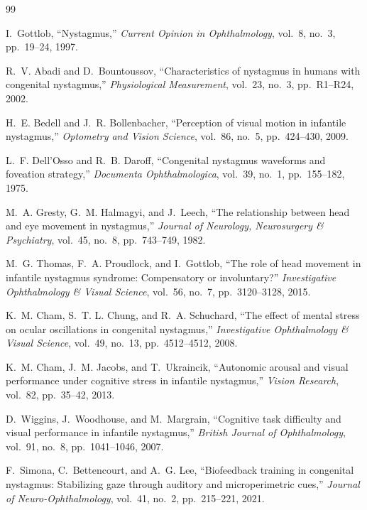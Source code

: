 \documentclass[12pt,a4paper,oneside]{report}
\begin{document}
\cleardoublepage
{}
\begin{thebibliography}{99}

I.~Gottlob, ``Nystagmus,'' \emph{Current Opinion in Ophthalmology}, vol.~8, no.~3, pp.~19--24, 1997.

R.~V. Abadi and D.~Bountoussov, ``Characteristics of nystagmus in humans with congenital nystagmus,'' \emph{Physiological Measurement}, vol.~23, no.~3, pp.~R1--R24, 2002.

H.~E. Bedell and J.~R. Bollenbacher, ``Perception of visual motion in infantile nystagmus,'' \emph{Optometry and Vision Science}, vol.~86, no.~5, pp.~424--430, 2009.

L.~F. Dell'Osso and R.~B. Daroff, ``Congenital nystagmus waveforms and foveation strategy,'' \emph{Documenta Ophthalmologica}, vol.~39, no.~1, pp.~155--182, 1975.

M.~A. Gresty, G.~M. Halmagyi, and J.~Leech, ``The relationship between head and eye movement in nystagmus,'' \emph{Journal of Neurology, Neurosurgery \& Psychiatry}, vol.~45, no.~8, pp.~743--749, 1982.

M.~G. Thomas, F.~A. Proudlock, and I.~Gottlob, ``The role of head movement in infantile nystagmus syndrome: Compensatory or involuntary?'' \emph{Investigative Ophthalmology \& Visual Science}, vol.~56, no.~7, pp.~3120--3128, 2015.

K.~M. Cham, S.~T. L. Chung, and R.~A. Schuchard, ``The effect of mental stress on ocular oscillations in congenital nystagmus,'' \emph{Investigative Ophthalmology \& Visual Science}, vol.~49, no.~13, pp.~4512--4512, 2008.

K.~M. Cham, J.~M. Jacobs, and T.~Ukraincik, ``Autonomic arousal and visual performance under cognitive stress in infantile nystagmus,'' \emph{Vision Research}, vol.~82, pp.~35--42, 2013.

D.~Wiggins, J.~Woodhouse, and M.~Margrain, ``Cognitive task difficulty and visual performance in infantile nystagmus,'' \emph{British Journal of Ophthalmology}, vol.~91, no.~8, pp.~1041--1046, 2007.

F.~Simona, C.~Bettencourt, and A.~G. Lee, ``Biofeedback training in congenital nystagmus: Stabilizing gaze through auditory and microperimetric cues,'' \emph{Journal of Neuro-Ophthalmology}, vol.~41, no.~2, pp.~215--221, 2021.


\end{thebibliography}
\end{document}
